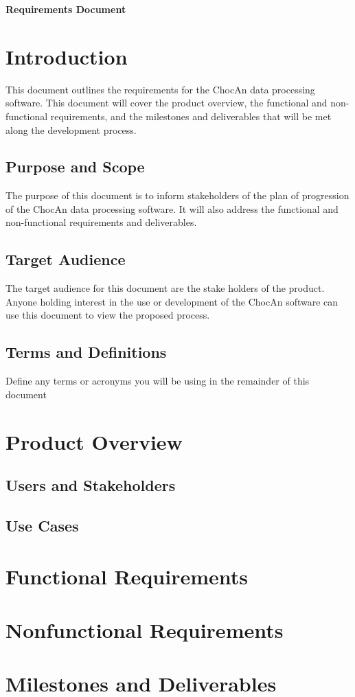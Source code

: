 \documentclass{article}
\renewcommand{\maketitle}{
   \begin{center}
      {\Huge \bfseries Requirements Document}
   \end{center}
}
\begin{document}
\maketitle
\tableofcontents

\section{Introduction}
This document outlines the requirements for the ChocAn data processing software. This document will cover the product overview, the functional and non-functional requirements, and the milestones and deliverables that will be met along the development process.

\subsection{Purpose and Scope}
The purpose of this document is to inform stakeholders of the plan of progression of the ChocAn data processing software. It will also address the functional and non-functional requirements and deliverables.

\subsection{Target Audience}
The target audience for this document are the stake holders of the product. Anyone holding interest in the use or development of the ChocAn software can use this document to view the proposed process.

\subsection{Terms and Definitions}
Define any terms or acronyms you will be using in the remainder of this document

\section{Product Overview}
\subsection{Users and Stakeholders}
\subsection{Use Cases}

\section{Functional Requirements}

\section{Nonfunctional Requirements}

\section{Milestones and Deliverables}
\end{document}
